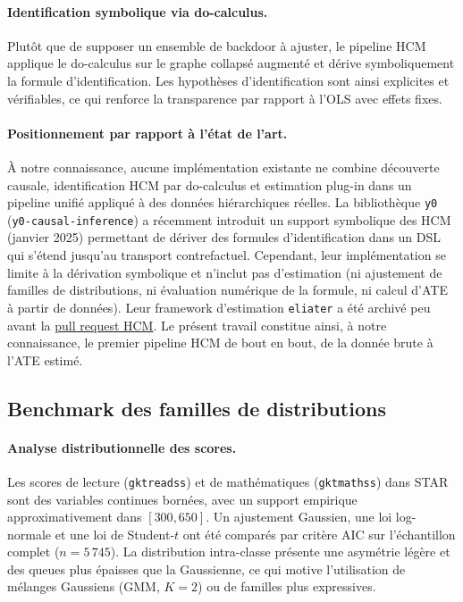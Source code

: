 \documentclass[11pt,a4paper]{article}
\begin{document}
\paragraph{Identification symbolique via do-calculus.} Plutôt que de supposer un ensemble de backdoor à ajuster, le pipeline HCM applique le do-calculus sur le graphe collapsé augmenté et dérive symboliquement la formule d'identification. Les hypothèses d'identification sont ainsi explicites et vérifiables, ce qui renforce la transparence par rapport à l'OLS avec effets fixes.

\paragraph{Positionnement par rapport à l'état de l'art.} À notre connaissance, aucune implémentation existante ne combine découverte causale, identification HCM par do-calculus et estimation plug-in dans un pipeline unifié appliqué à des données hiérarchiques réelles. La bibliothèque \texttt{y0} (\texttt{y0-causal-inference}) a récemment introduit un support symbolique des HCM (janvier 2025) permettant de dériver des formules d'identification dans un DSL qui s'étend jusqu'au transport contrefactuel. Cependant, leur implémentation se limite à la dérivation symbolique et n'inclut pas d'estimation (ni ajustement de familles de distributions, ni évaluation numérique de la formule, ni calcul d'ATE à partir de données). Leur framework d'estimation \texttt{eliater} a été archivé peu avant la \href{https://github.com/y0-causal-inference/y0/pull/236}{pull request HCM}. Le présent travail constitue ainsi, à notre connaissance, le premier pipeline HCM de bout en bout, de la donnée brute à l'ATE estimé.

\subsection{Benchmark des familles de distributions}

\paragraph{Analyse distributionnelle des scores.}
Les scores de lecture (\texttt{gktreadss}) et de mathématiques (\texttt{gktmathss}) dans STAR sont des variables continues bornées, avec un support empirique approximativement dans $[300, 650]$. Un ajustement Gaussien, une loi log-normale et une loi de Student-$t$ ont été comparés par critère AIC sur l'échantillon complet ($n=5\,745$). La distribution intra-classe présente une asymétrie légère et des queues plus épaisses que la Gaussienne, ce qui motive l'utilisation de mélanges Gaussiens (GMM, $K=2$) ou de familles plus expressives.
\end{document}
